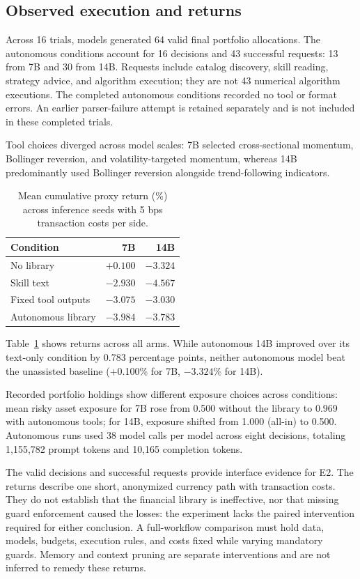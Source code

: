 \subsection{Observed execution and returns}
Across 16 trials, models generated 64 valid final portfolio allocations. The autonomous
conditions account for 16 decisions and 43 successful requests: 13 from 7B and 30 from
14B. Requests include catalog discovery, skill reading, strategy advice, and algorithm
execution; they are not 43 numerical algorithm executions. The completed autonomous
conditions recorded no tool or format errors. An earlier parser-failure attempt is
retained separately and is not included in these completed trials.

Tool choices diverged across model scales: 7B selected cross-sectional momentum,
Bollinger reversion, and volatility-targeted momentum, whereas 14B predominantly used
Bollinger reversion alongside trend-following indicators.

\begin{table}[t]
\centering\small
\begin{tabular}{lrr}
\toprule
Condition & 7B & 14B \\
\midrule
No library & $+0.100$ & $-3.324$ \\
Skill text & $-2.930$ & $-4.567$ \\
Fixed tool outputs & $-3.075$ & $-3.030$ \\
Autonomous library & $-3.984$ & $-3.783$ \\
\bottomrule
\end{tabular}
\caption{Mean cumulative proxy return (\%) across inference seeds with 5 bps transaction costs per side.}
\label{tab:autonomous}
\end{table}

Table~\ref{tab:autonomous} shows returns across all arms. While autonomous 14B improved
over its text-only condition by 0.783 percentage points, neither autonomous model beat
the unassisted baseline (+0.100\% for 7B, $-3.324\%$ for 14B).

Recorded portfolio holdings show different exposure choices across conditions:
mean risky asset exposure for 7B rose from 0.500 without the library to 0.969 with
autonomous tools; for 14B, exposure shifted from 1.000 (all-in) to 0.500. Autonomous
runs used 38 model calls per model across eight decisions, totaling 1,155,782 prompt
tokens and 10,165 completion tokens.

The valid decisions and successful requests provide interface evidence for E2. The
returns describe one short, anonymized currency path with transaction costs. They do
not establish that the financial library is ineffective, nor that missing guard
enforcement caused the losses: the experiment lacks the paired intervention required
for either conclusion. A full-workflow comparison must hold data, models, budgets,
execution rules, and costs fixed while varying mandatory guards. Memory and context
pruning are separate interventions and are not inferred to remedy these returns.
